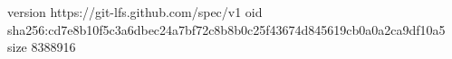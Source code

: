 version https://git-lfs.github.com/spec/v1
oid sha256:cd7e8b10f5c3a6dbec24a7bf72c8b8b0c25f43674d845619cb0a0a2ca9df10a5
size 8388916
